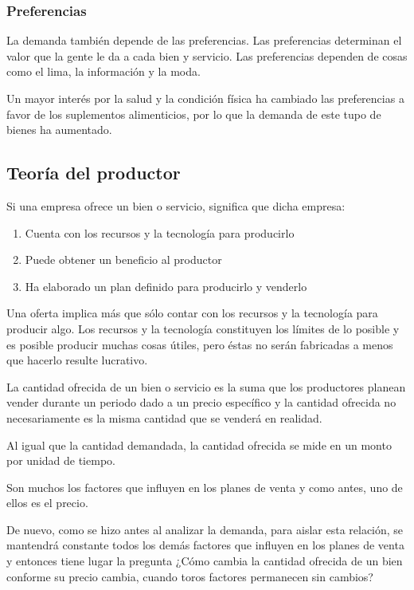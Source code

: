 \subsubsection{Preferencias}
La demanda también depende de las preferencias. Las preferencias determinan el valor que la gente le da a cada bien y servicio. Las preferencias dependen de cosas como el lima, la información y la moda.

\begin{example}
    Un mayor interés por la salud y la condición física ha cambiado las preferencias a favor de los suplementos alimenticios, por lo que la demanda de este tupo de bienes ha aumentado.
\end{example}
\subsection{Teoría del productor}
Si una empresa ofrece un bien o servicio, significa que dicha empresa:
\begin{enumerate}
    \item Cuenta con los recursos y la tecnología para producirlo
    \item Puede obtener un beneficio al productor
    \item Ha elaborado un plan definido para producirlo y venderlo
\end{enumerate}
Una oferta implica más que sólo contar con los recursos y la tecnología para producir algo. Los recursos y la tecnología constituyen los límites de lo posible y es posible producir muchas cosas útiles, pero éstas no serán fabricadas a menos que hacerlo resulte lucrativo.

La cantidad ofrecida de un bien o servicio es la suma que los productores planean vender durante un periodo dado a un precio específico y la cantidad ofrecida no necesariamente es la misma cantidad que se venderá en realidad.

Al igual que la cantidad demandada, la cantidad ofrecida se mide en un monto por unidad de tiempo.

Son muchos los factores que influyen en los planes de venta y como antes, uno de ellos es el precio.

De nuevo, como se hizo antes al analizar la demanda, para aislar esta relación, se mantendrá constante todos los demás factores que influyen en los planes de venta y entonces tiene lugar la pregunta ¿Cómo cambia la cantidad ofrecida de un bien conforme su precio cambia, cuando toros factores permanecen sin cambios?

